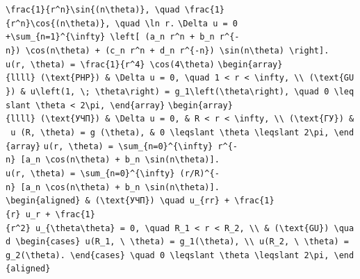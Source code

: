 \documentclass[
  ukrainian,
]{article}
\begin{document}
\texttt{\textbackslash{}frac\{1\}\{r\^{}n\}\textbackslash{}sin\{(n\textbackslash{}theta)\},\ \textbackslash{}quad\ \textbackslash{}frac\{1\}\{r\^{}n\}\textbackslash{}cos\{(n\textbackslash{}theta)\},\ \textbackslash{}quad\ \textbackslash{}ln\ r.}
\texttt{\textbackslash{}Delta\ u\ =\ 0}
\texttt{+\textbackslash{}sum\_\{n=1\}\^{}\{\textbackslash{}infty\}\ \textbackslash{}left{[}\ (a\_n\ r\^{}n\ +\ b\_n\ r\^{}\{-n\})\ \textbackslash{}cos(n\textbackslash{}theta)\ +\ (c\_n\ r\^{}n\ +\ d\_n\ r\^{}\{-n\})\ \textbackslash{}sin(n\textbackslash{}theta)\ \textbackslash{}right{]}.}
\texttt{u(r,\ \textbackslash{}theta)\ =\ \textbackslash{}frac\{1\}\{r\^{}4\}\ \textbackslash{}cos(4\textbackslash{}theta)}
\texttt{\textbackslash{}begin\{array\}\{llll\}\ (\textbackslash{}text\{PHP\})\ \&\ \textbackslash{}Delta\ u\ =\ 0,\ \textbackslash{}quad\ 1\ \textless{}\ r\ \textless{}\ \textbackslash{}infty,\ \textbackslash{}\textbackslash{}\ (\textbackslash{}text\{GU\})\ \&\ u\textbackslash{}left(1,\ \textbackslash{};\ \textbackslash{}theta\textbackslash{}right)\ =\ g\_1\textbackslash{}left(\textbackslash{}theta\textbackslash{}right),\ \textbackslash{}quad\ 0\ \textbackslash{}leqslant\ \textbackslash{}theta\ \textless{}\ 2\textbackslash{}pi,\ \textbackslash{}end\{array\}}
\texttt{\textbackslash{}begin\{array\}\{llll\}\ (\textbackslash{}text\{УЧП\})\ \&\ \textbackslash{}Delta\ u\ =\ 0,\ \&\ R\ \textless{}\ r\ \textless{}\ \textbackslash{}infty,\ \textbackslash{}\textbackslash{}\ (\textbackslash{}text\{ГУ\})\ \&\ u\ (R,\ \textbackslash{}theta)\ =\ g\ (\textbackslash{}theta),\ \&\ 0\ \textbackslash{}leqslant\ \textbackslash{}theta\ \textbackslash{}leqslant\ 2\textbackslash{}pi,\ \textbackslash{}end\{array\}}
\texttt{u(r,\ \textbackslash{}theta)\ =\ \textbackslash{}sum\_\{n=0\}\^{}\{\textbackslash{}infty\}\ r\^{}\{-n\}\ {[}a\_n\ \textbackslash{}cos(n\textbackslash{}theta)\ +\ b\_n\ \textbackslash{}sin(n\textbackslash{}theta){]}.}
\texttt{u(r,\ \textbackslash{}theta)\ =\ \textbackslash{}sum\_\{n=0\}\^{}\{\textbackslash{}infty\}\ (r/R)\^{}\{-n\}\ {[}a\_n\ \textbackslash{}cos(n\textbackslash{}theta)\ +\ b\_n\ \textbackslash{}sin(n\textbackslash{}theta){]}.}
\texttt{\textbackslash{}begin\{aligned\}\ \&\ (\textbackslash{}text\{УЧП\})\ \textbackslash{}quad\ u\_\{rr\}\ +\ \textbackslash{}frac\{1\}\{r\}\ u\_r\ +\ \textbackslash{}frac\{1\}\{r\^{}2\}\ u\_\{\textbackslash{}theta\textbackslash{}theta\}\ =\ 0,\ \textbackslash{}quad\ R\_1\ \textless{}\ r\ \textless{}\ R\_2,\ \textbackslash{}\textbackslash{}\ \&\ (\textbackslash{}text\{GU\})\ \textbackslash{}quad\ \textbackslash{}begin\{cases\}\ u(R\_1,\ \textbackslash{}\ \textbackslash{}theta)\ =\ g\_1(\textbackslash{}theta),\ \textbackslash{}\textbackslash{}\ u(R\_2,\ \textbackslash{}\ \textbackslash{}theta)\ =\ g\_2(\textbackslash{}theta).\ \textbackslash{}end\{cases\}\ \textbackslash{}quad\ 0\ \textbackslash{}leqslant\ \textbackslash{}theta\ \textbackslash{}leqslant\ 2\textbackslash{}pi,\ \textbackslash{}end\{aligned\}}
\end{document}
